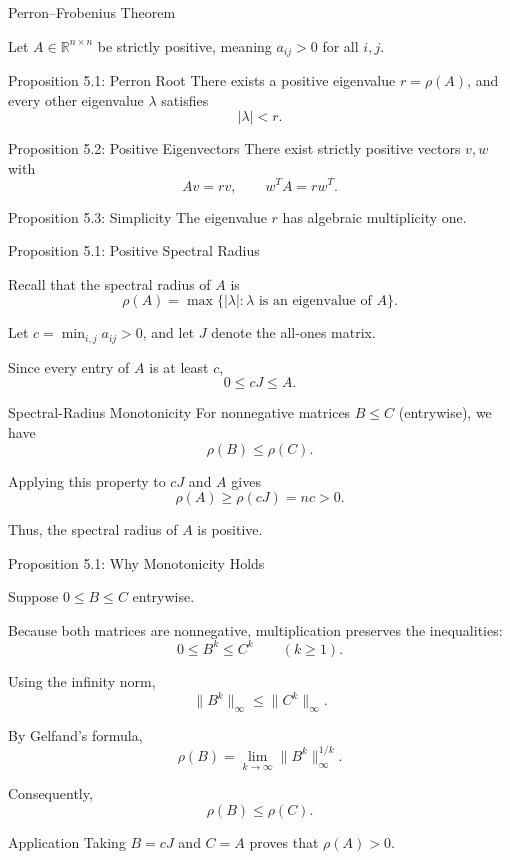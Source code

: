 \documentclass[aspectratio=169,10pt]{beamer}
\begin{document}
\begin{frame}[shrink=0]{Perron--Frobenius Theorem}
\small

Let $A\in\mathbb{R}^{n\times n}$ be strictly positive,
meaning $a_{ij}>0$ for all $i,j$.

\begin{block}{Proposition 5.1: Perron Root}
There exists a positive eigenvalue $r=\rho(A)$,
and every other eigenvalue $\lambda$ satisfies
\[
|\lambda|<r.
\]
\end{block}

\begin{block}{Proposition 5.2: Positive Eigenvectors}
There exist strictly positive vectors $v,w$ with
\[
Av=rv,\qquad w^TA=rw^T.
\]
\end{block}

\begin{block}{Proposition 5.3: Simplicity}
The eigenvalue $r$ has algebraic multiplicity one.
\end{block}

\end{frame}



\begin{frame}[shrink=0]{Proposition 5.1: Positive Spectral Radius}
\small

Recall that the spectral radius of $A$ is
\[
\rho(A)=\max\{|\lambda|:
\lambda\text{ is an eigenvalue of }A\}.
\]

Let $c=\min_{i,j}a_{ij}>0$, and let $J$
denote the all-ones matrix.

Since every entry of $A$ is at least $c$,
\[
0\leq cJ\leq A.
\]

\begin{block}{Spectral-Radius Monotonicity}
For nonnegative matrices $B\leq C$
(entrywise), we have
\[
\rho(B)\leq\rho(C).
\]
\end{block}

Applying this property to $cJ$ and $A$ gives
\[
\boxed{\rho(A)\geq\rho(cJ)=nc>0.}
\]

Thus, the spectral radius of $A$ is positive.

\end{frame}

\begin{frame}[shrink=0]{Proposition 5.1: Why Monotonicity Holds}
\small

Suppose $0\leq B\leq C$ entrywise.

Because both matrices are nonnegative,
multiplication preserves the inequalities:
\[
0\leq B^k\leq C^k
\qquad(k\geq1).
\]

Using the infinity norm,
\[
\|B^k\|_\infty\leq\|C^k\|_\infty.
\]

By Gelfand's formula,
\[
\rho(B)=\lim_{k\to\infty}
\|B^k\|_\infty^{1/k}.
\]

Consequently,
\[
\boxed{\rho(B)\leq\rho(C).}
\]

\begin{block}{Application}
Taking $B=cJ$ and $C=A$ proves
that $\rho(A)>0$.
\end{block}

\end{frame}
\end{document}
